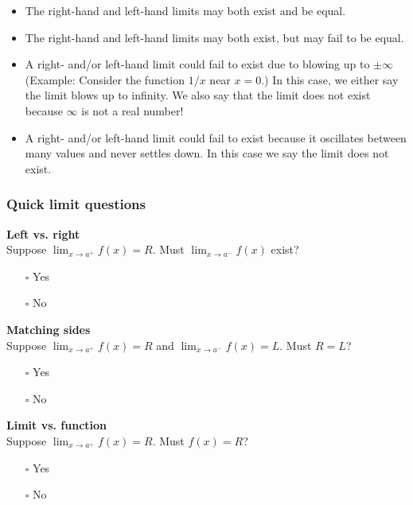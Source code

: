 \documentclass[pdftex, brazil, 12pt, twoside]{article}
\begin{document}
\begin{itemize}
\item The right-hand and left-hand limits may both exist and be equal.
\item The right-hand and left-hand limits may both exist, but may fail to be equal.
\item A right- and/or left-hand limit could fail to exist due to blowing up to $\pm \infty$
  (Example: Consider the function $1/x$ near $x=0$.) In this case, we either say
  the limit blows up to infinity. We also say that the limit does not exist
  because $\infty$ is not a real number!
\item A right- and/or left-hand limit could fail to exist because it oscillates
  between many values and never settles down. In this case we say the limit does not exist.
\end{itemize}

\subsubsection{Quick limit questions}
\label{u0-intro-questions}

\begin{exercise}
  \textbf{Left vs. right}\\
  Suppose $\lim_{x \to a^{+}} f(x) = R$. Must
  $\lim_{x \to a^{-}} f(x)$ exist?
  \begin{itemize}[noitemsep]
  \item[$\square$] Yes
  \item[$\square$] No
  \end{itemize}
\end{exercise}

\begin{exercise}
  \textbf{Matching sides}\\
  Suppose $\lim_{x \to a^{+}} f(x) = R$ and 
  $\lim_{x \to a^{-}} f(x) = L$. Must $R = L$?
  \begin{itemize}[noitemsep]
  \item[$\square$] Yes
  \item[$\square$] No
  \end{itemize}
\end{exercise}

\begin{exercise}
  \textbf{Limit vs. function}\\
  Suppose $\lim_{x \to a^{+}} f(x) = R$.
  Must $f(x) =R$?
  \begin{itemize}[noitemsep]
  \item[$\square$] Yes
  \item[$\square$] No
  \end{itemize}
\end{exercise}
\end{document}
